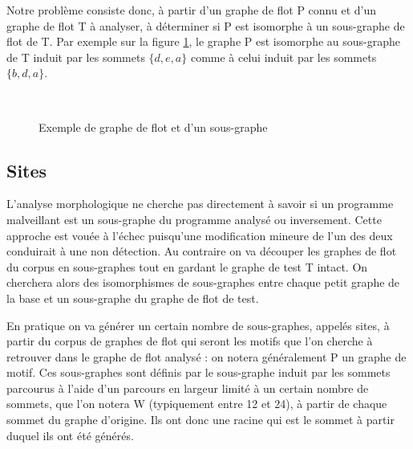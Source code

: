 Notre problème consiste donc, à partir d'un graphe de flot P connu et d'un graphe de flot T à analyser, à déterminer si P est isomorphe à un sous-graphe de flot de T.
Par exemple sur la figure \ref{fig:ex-gf-sous-gf}, le graphe P est isomorphe au sous-graphe de T induit par les sommets $\{d, e, a\}$ comme à celui induit par les sommets $\{b, d, a\}$.


\begin{figure}[ht]
\begin{center}
  \subfigure[Graphe de flot T]{
\label{fig:ex-gf}
\texttt{[image: supports/algos/gTGF\_circo\_cropped0.pdf]}
}\quad
  \subfigure[Graphe de flot P, isomorphe à un sous-graphe de T]{
\label{fig:ex-sous-gf}
\texttt{[image: supports/algos/gPGF\_circo\_cropped0.pdf]}
}\\
\end{center}
\caption{Exemple de graphe de flot et d'un sous-graphe}
\label{fig:ex-gf-sous-gf}
\end{figure}

\subsection{Sites}
L'analyse morphologique \cite{BKM08} ne cherche pas directement à savoir si un programme malveillant est un sous-graphe du programme analysé ou inversement. 
Cette approche est vouée à l'échec puisqu'une modification mineure de l'un des deux conduirait à une non détection.
Au contraire on va découper les graphes de flot du corpus en sous-graphes tout en gardant le graphe de test T intact.
On cherchera alors des isomorphismes de sous-graphes entre chaque petit graphe de la base et un sous-graphe du graphe de flot de test.

En pratique on va générer un certain nombre de sous-graphes, appelés sites, à partir du corpus de graphes de flot qui seront les motifs que l'on cherche à retrouver dans le graphe de flot analysé : on notera généralement P un graphe de motif. 
Ces sous-graphes sont définis par le sous-graphe induit par les sommets parcourus à l'aide d'un parcours en largeur limité à un certain nombre de sommets, que l'on notera W (typiquement entre 12 et 24), à partir de chaque sommet du graphe d'origine. Ils ont donc une racine qui est le sommet à partir duquel ils ont été générés.

